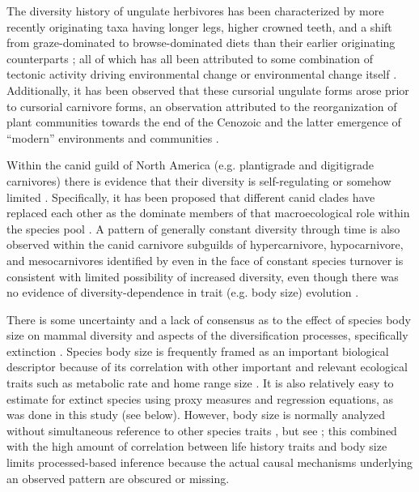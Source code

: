 \documentclass[12pt,letterpaper]{article}
\begin{document}
The diversity history of ungulate herbivores has been characterized by more recently originating taxa having longer legs, higher crowned teeth, and a shift from graze-dominated to browse-dominated diets than their earlier originating counterparts \citep{Janis2004,Janis2000,Janis1993c,Janis2008a,Cantalapiedra2017,Fraser2015a}; all of which has all been attributed to some combination of tectonic activity driving environmental change or environmental change itself \citep{Janis2008a,Eronen2015,Blois2009,Badgley2017}. Additionally, it has been observed that these cursorial ungulate forms arose prior to cursorial carnivore forms, an observation attributed to the reorganization of plant communities towards the end of the Cenozoic and the latter emergence of ``modern'' environments and communities \citep{Janis1993c}.

Within the canid guild of North America (e.g. plantigrade and digitigrade carnivores) there is evidence that their diversity is self-regulating or somehow limited \citep{Valkenburgh1999}. Specifically, it has been proposed that different canid clades have replaced each other as the dominate members of that macroecological role within the species pool \citep{Silvestro2015b}. A pattern of generally constant diversity through time is also observed within the canid carnivore subguilds of hypercarnivore, hypocarnivore, and mesocarnivores identified by \citet{Slater2015c} even in the face of constant species turnover is consistent with limited possibility of increased diversity, even though there was no evidence of diversity-dependence in trait (e.g. body size) evolution \citep{Slater2015c}.

There is some uncertainty and a lack of consensus as to the effect of species body size on mammal diversity and aspects of the diversification processes, specifically extinction \citep{Liow2008,Liow2009,Tomiya2013,Smits2015b}. Species body size is frequently framed as an important biological descriptor because of its correlation with other important and relevant ecological traits such as metabolic rate and home range size \citep{Brown1995}. It is also relatively easy to estimate for extinct species using proxy measures and regression equations, as was done in this study (see below). However, body size is normally analyzed without simultaneous reference to other species traits \citep{Liow2008,Huang2017,Raia2012f,Smith2004}, but see \citep{Smits2015b}; this combined with the high amount of correlation between life history traits and body size limits processed-based inference because the actual causal mechanisms underlying an observed pattern are obscured or missing.
\end{document}
